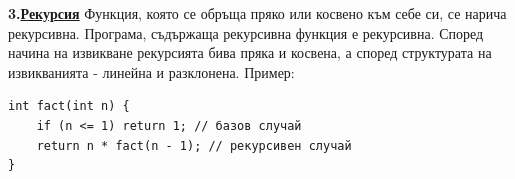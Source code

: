 \documentclass{article}
\begin{document}
\textbf{3.\underline{Рекурсия}} \newline\newline
Функция, която се обръща пряко или косвено към себе си, се нарича рекурсивна. Програма, съдържаща рекурсивна функция е рекурсивна. Според начина
на извикване рекурсията бива пряка и косвена, а според структурата на извикванията - линейна и разклонена.\newline\newline
Пример:
\begin{lstlisting}[style=cpp]
int fact(int n) { 
    if (n <= 1) return 1; // базов случай
    return n * fact(n - 1); // рекурсивен случай
} 
\end{lstlisting}
\end{document}

